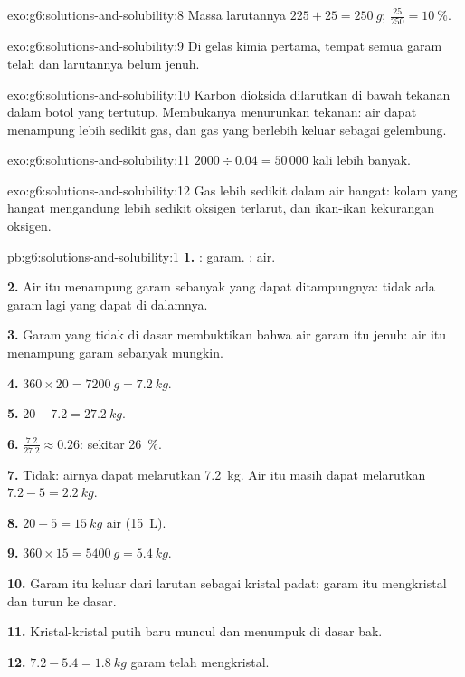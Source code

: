 \begin{solution}{exo:g6:solutions-and-solubility:8}
Massa larutannya $225 + 25 = \qty{250}{g}$; $\frac{25}{250} =
\qty{10}{\percent}$.
\end{solution}

\begin{solution}{exo:g6:solutions-and-solubility:9}
Di gelas kimia pertama, tempat semua garam telah  dan larutannya
belum jenuh.
\end{solution}

\begin{solution}{exo:g6:solutions-and-solubility:10}
Karbon dioksida dilarutkan di bawah tekanan dalam botol yang tertutup.
Membukanya menurunkan tekanan: air dapat menampung lebih sedikit gas,
dan gas yang berlebih keluar sebagai gelembung.
\end{solution}

\begin{solution}{exo:g6:solutions-and-solubility:11}
$2000 \div 0.04 = 50\,000$ kali lebih banyak.
\end{solution}

\begin{solution}{exo:g6:solutions-and-solubility:12}
Gas lebih sedikit  dalam air hangat: kolam yang hangat mengandung
lebih sedikit oksigen terlarut, dan ikan-ikan kekurangan oksigen.
\end{solution}

\begin{solution}{pb:g6:solutions-and-solubility:1}
\textbf{1.} : garam. : air.

\textbf{2.} Air itu menampung garam sebanyak yang dapat ditampungnya:
tidak ada garam lagi yang dapat  di dalamnya.

\textbf{3.} Garam yang tidak  di dasar membuktikan bahwa air garam
itu jenuh: air itu menampung garam sebanyak mungkin.

\textbf{4.} $360 \times 20 = \qty{7200}{g} = \qty{7.2}{kg}$.

\textbf{5.} $20 + 7.2 = \qty{27.2}{kg}$.

\textbf{6.} $\frac{7.2}{27.2} \approx 0.26$: sekitar \qty{26}{\percent}.

\textbf{7.} Tidak: airnya dapat melarutkan \qty{7.2}{kg}. Air itu masih
dapat melarutkan $7.2 - 5 = \qty{2.2}{kg}$.

\textbf{8.} $20 - 5 = \qty{15}{kg}$ air (\qty{15}{L}).

\textbf{9.} $360 \times 15 = \qty{5400}{g} = \qty{5.4}{kg}$.

\textbf{10.} Garam itu keluar dari larutan sebagai kristal padat: garam
itu mengkristal dan turun ke dasar.

\textbf{11.} Kristal-kristal putih baru muncul dan menumpuk di dasar
bak.

\textbf{12.} $7.2 - 5.4 = \qty{1.8}{kg}$ garam telah mengkristal.
\end{solution}
